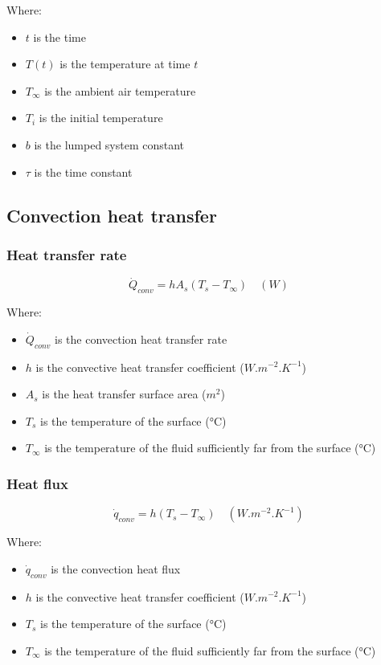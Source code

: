 \documentclass[11pt]{article}
\begin{document}
Where:
\begin{itemize}
\item \(t\) is the time
\item \(T(t)\) is the temperature at time \(t\)
\item \(T_{\infty}\) is the ambient air temperature
\item \(T_i\) is the initial temperature
\item \(b\) is the lumped system constant
\item \(\tau\) is the time constant
\end{itemize}
\subsection{Convection heat transfer}
\label{sec:orga44909e}

\subsubsection{Heat transfer rate}
\label{sec:org13e724f}
\[\dot{Q}_{conv} = h A_s (T_s - T_{\infty}) \quad (\unit{W})\]

Where:
\begin{itemize}
\item \(\dot{Q}_{conv}\) is the convection heat transfer rate
\item \(h\) is the convective heat transfer coefficient (\(\unit{W.m^{-2}.K^{-1}}\))
\item \(A_s\) is the heat transfer surface area (\(\unit{m^{2}}\))
\item \(T_s\) is the temperature of the surface (\(\unit{\degreeCelsius}\))
\item \(T_{\infty}\) is the temperature of the fluid sufficiently far from the surface (\(\unit{\degreeCelsius}\))
\end{itemize}
\subsubsection{Heat flux}
\label{sec:org36ef322}
\[\dot{q}_{conv} = h (T_s - T_{\infty}) \quad (\unit{W.m^{-2}.K^{-1}})\]

Where:
\begin{itemize}
\item \(\dot{q}_{conv}\) is the convection heat flux
\item \(h\) is the convective heat transfer coefficient (\(\unit{W.m^{-2}.K^{-1}}\))
\item \(T_s\) is the temperature of the surface (\(\unit{\degreeCelsius}\))
\item \(T_{\infty}\) is the temperature of the fluid sufficiently far from the surface (\(\unit{\degreeCelsius}\))
\end{itemize}
\end{document}
